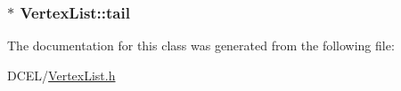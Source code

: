 \subsubsection[{\texorpdfstring{tail}{tail}}]{$\ast$ Vertex\+List\+::tail}\hypertarget{classVertexList_abe95a569380189ea9552c8eb4c927d7d}{}\label{classVertexList_abe95a569380189ea9552c8eb4c927d7d}


The documentation for this class was generated from the following file\+:\begin{DoxyCompactItemize}
\item 
D\+C\+E\+L/\hyperlink{VertexList_8h}{Vertex\+List.\+h}\end{DoxyCompactItemize}

